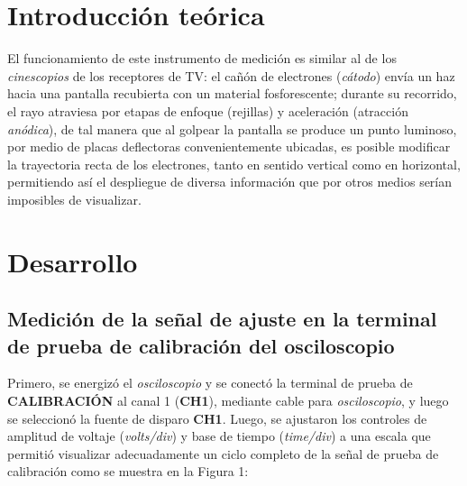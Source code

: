 \documentclass[a4paper,12pt]{article}
\begin{document}
\section{Introducción teórica}


El funcionamiento de este instrumento de medición es similar al de los \emph{cinescopios} de los receptores de TV: el cañón de electrones (\emph{cátodo}) envía un haz hacia una pantalla recubierta con un material fosforescente; durante su recorrido, el rayo atraviesa por etapas de enfoque (rejillas) y aceleración (atracción \emph{anódica}), de tal manera que al golpear la pantalla se produce un punto luminoso, por medio de placas deflectoras convenientemente ubicadas, es posible modificar la trayectoria recta de los electrones, tanto en sentido vertical como en horizontal, permitiendo así el despliegue de diversa información que por otros medios serían imposibles de visualizar.\par


\section{Desarrollo}
\subsection{Medición de la señal de ajuste en la terminal de prueba de calibración del osciloscopio}

Primero, se energizó el \emph{osciloscopio} y se conectó la terminal de prueba de \textbf{CALIBRACIÓN} al canal 1 (\textbf{CH1}), mediante cable para \emph{osciloscopio}, y luego se seleccionó la fuente de disparo \textbf{CH1}. Luego, se ajustaron los controles de amplitud de voltaje (\emph{volts/div}) y base de tiempo (\emph{time/div}) a una escala que permitió visualizar adecuadamente un ciclo completo de la señal de prueba de calibración como se muestra en la Figura 1:
\end{document}
